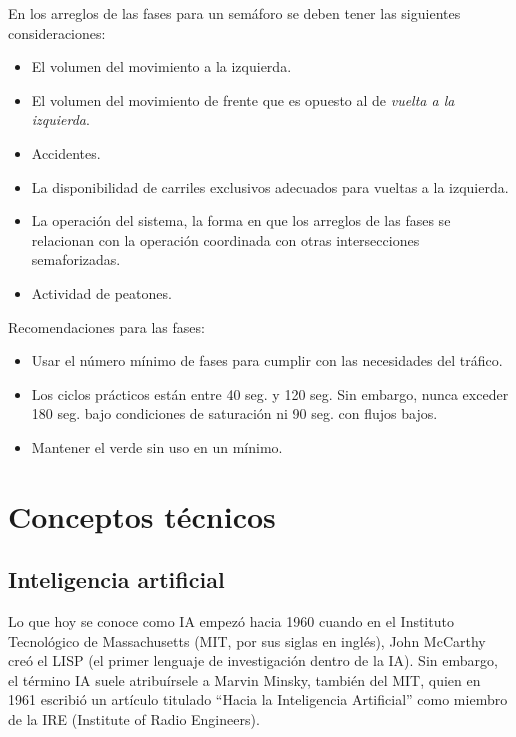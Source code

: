En los arreglos de las fases para un semáforo se deben tener las siguientes consideraciones: \label{consideracionesfases}

{\setlength{\baselineskip}{0.7\baselineskip}\begin{itemize}
	\item El volumen del movimiento a la izquierda.
	\item El volumen del movimiento de frente que es opuesto al de \emph{vuelta a la izquierda}.
	\item Accidentes.
	\item La disponibilidad de carriles exclusivos adecuados para vueltas a la izquierda. 
	\item La operación del sistema, la forma en que los arreglos de las fases se relacionan con la operación coordinada con otras intersecciones semaforizadas. 
	\item Actividad de peatones.
\end{itemize}}

Recomendaciones para las fases: \label{recomendacionesfases}

{\setlength{\baselineskip}{0.7\baselineskip}\begin{itemize}
	\item Usar el número mínimo de fases para cumplir con las necesidades del tráfico. 
	\item Los ciclos prácticos están entre 40 seg. y 120 seg. Sin embargo, nunca exceder 180 seg. bajo condiciones de saturación ni 90 seg. con flujos bajos. 
	\item Mantener el verde sin uso en un mínimo.
\end{itemize}}

\section{Conceptos técnicos}

\subsection{Inteligencia artificial}

Lo que hoy se conoce como IA empezó hacia 1960 cuando en el Instituto Tecnológico de
Massachusetts (MIT, por sus siglas en inglés), John McCarthy creó el LISP (el primer lenguaje
de investigación dentro de la IA). Sin embargo, el término IA suele atribuírsele a Marvin Minsky,
también del MIT, quien en 1961 escribió un artículo titulado “Hacia la Inteligencia Artificial” como miembro de la IRE
(Institute of Radio Engineers).

